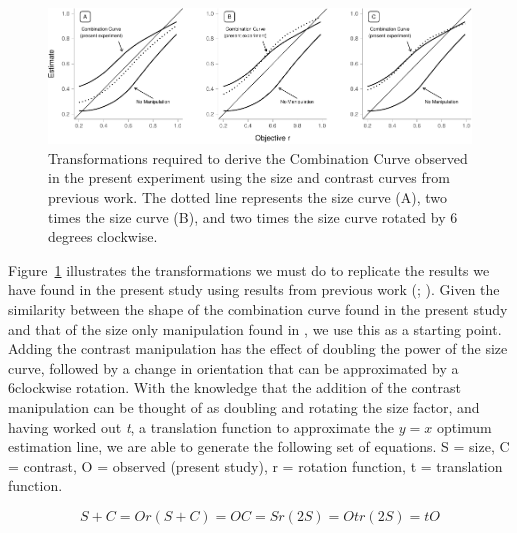 \documentclass[manuscript, review, anonymous, screen]{acmart}
\begin{document}
\begin{figure}

{\centering \includegraphics[width=1\textwidth,height=\textheight]{size_and_contrast_new_files/figure-pdf/fig-transformation-1.pdf}

}

\caption{\label{fig-transformation}Transformations required to derive
the Combination Curve observed in the present experiment using the size
and contrast curves from previous work. The dotted line represents the
size curve (A), two times the size curve (B), and two times the size
curve rotated by 6 degrees clockwise.}

\end{figure}

Figure~\ref{fig-transformation} illustrates the transformations we must
do to replicate the results we have found in the present study using
results from previous work (\citet{strain_2023}; \citet{strain_2023b}).
Given the similarity between the shape of the combination curve found in
the present study and that of the size only manipulation found in
\citet{strain_2023b}, we use this as a starting point. Adding the
contrast manipulation has the effect of doubling the power of the size
curve, followed by a change in orientation that can be approximated by a
6\textdegree clockwise rotation. With the knowledge that the addition of
the contrast manipulation can be thought of as doubling and rotating the
size factor, and having worked out \emph{t}, a translation function to
approximate the \(y = x\) optimum estimation line, we are able to
generate the following set of equations. S = size, C = contrast, O =
observed (present study), r = rotation function, t = translation
function.

\begin{equation}
  S + C = O
  r(S + C) = O
  C = S
  r(2S) = O
  tr(2S) = tO
\end{equation}




\end{document}
